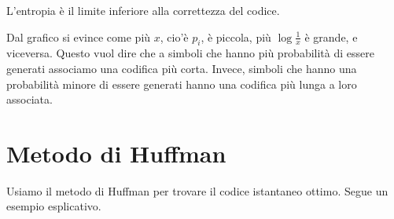 \documentclass[12pt]{report}
\begin{document}
    \begin{defi}
        L'entropia è il limite inferiore alla correttezza del codice.
    \end{defi}


    Dal grafico si evince come più $x$, cio'è $p_i$, è piccola, più $\log{\frac{1}{x}}$ è grande, e viceversa. Questo vuol dire che a simboli che hanno più probabilità di essere generati associamo una codifica più corta. Invece, simboli che hanno una probabilità minore di essere generati hanno una codifica più lunga a loro associata.

    \newpage
    \section{Metodo di Huffman}

    Usiamo il metodo di Huffman per trovare il codice istantaneo ottimo. Segue un esempio esplicativo.
\end{document}
